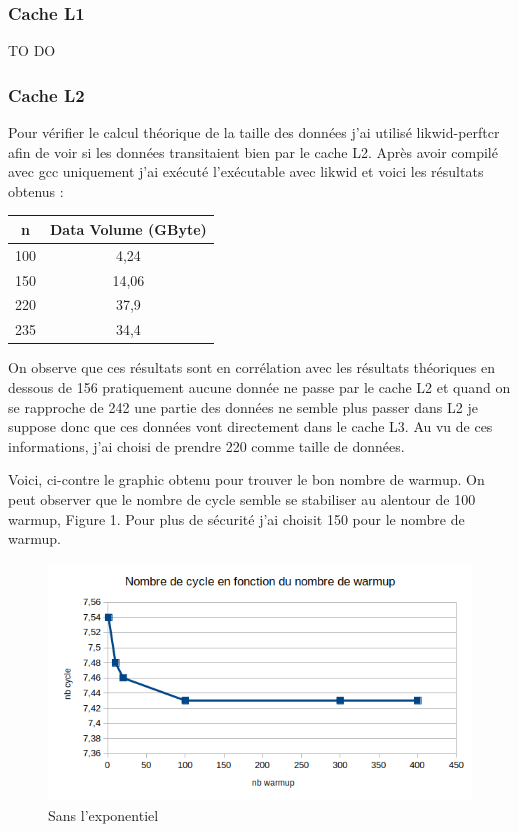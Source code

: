 \documentclass[12pt,a4paper]{article}
\begin{document}
\subsubsection{Cache L1}
TO DO

\subsubsection{Cache L2}
Pour vérifier le calcul théorique de la taille des données j'ai utilisé 
likwid-perftcr afin de voir si les données transitaient bien par le cache L2. 
Après avoir compilé avec gcc uniquement j'ai exécuté l'exécutable avec likwid 
et voici les résultats obtenus :
\newline

\begin{tabular}{|c|c|}
  \hline
  n & Data Volume (GByte) \\
  \hline
  100 & 4,24 \\
  \hline
  150 & 14,06 \\
  \hline
  220 & 37,9 \\
  \hline
  235 & 34,4 \\
  \hline
\end{tabular}

On observe que ces résultats sont en corrélation avec les résultats théoriques
en dessous de 156 pratiquement aucune donnée ne passe par le cache L2 et 
quand on se rapproche de 242 une partie des données ne semble plus passer 
dans L2 je suppose donc que ces données vont directement dans le cache L3.
Au vu de ces informations, j'ai choisi de prendre 220 comme taille de 
données.

Voici, ci-contre le graphic obtenu pour trouver le bon nombre de warmup. 
On peut observer que le nombre de cycle semble se stabiliser au alentour 
de 100 warmup, Figure 1. Pour plus de sécurité j'ai choisit 150 pour le nombre de 
warmup.

\begin{figure}
    \includegraphics[scale=0.8]{figures/L2/L2warmup.png}
    \caption{Sans l'exponentiel}
\end{figure}
\end{document}
